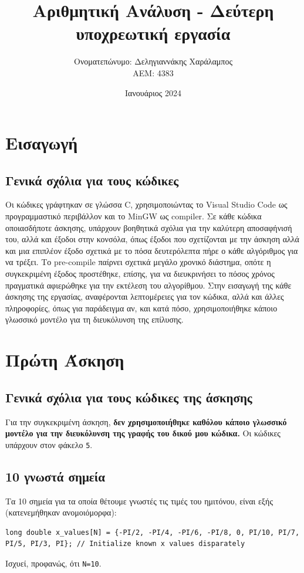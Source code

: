 \documentclass[a4paper, 14pt]{article}   %
\title{Αριθμητική Ανάλυση - Δεύτερη υποχρεωτική εργασία}   %
\author{Ονοματεπώνυμο: Δεληγιαννάκης Χαράλαμπος \\ ΑΕΜ: 4383}   %
\date{Ιανουάριος 2024}   %
\begin{document}

\maketitle   %

\section*{Εισαγωγή}   %


\subsection*{Γενικά σχόλια για τους κώδικες}   %
	Οι κώδικες γράφτηκαν σε γλώσσα C, χρησιμοποιώντας το Visual Studio Code ως προγραμμαστικό περιβάλλον και το MinGW ως compiler. Σε κάθε κώδικα οποιασδήποτε άσκησης, υπάρχουν βοηθητικά σχόλια για την καλύτερη αποσαφήνισή του, αλλά και έξοδοι στην κονσόλα, όπως έξοδοι που σχετίζονται με την άσκηση αλλά και μια επιπλέον έξοδο σχετικά με το πόσα δευτερόλεπτα πήρε ο κάθε αλγόριθμος για να τρέξει. Το pre-compile παίρνει σχετικά μεγάλο χρονικό διάστημα, οπότε η συγκεκριμένη έξοδος προστέθηκε, επίσης, για να διευκρινήσει το πόσος χρόνος πραγματικά αφιερώθηκε για την εκτέλεση του αλγορίθμου. Στην εισαγωγή της κάθε άσκησης της εργασίας, αναφέρονται λεπτομέρειες για τον κώδικα, αλλά και άλλες πληροφορίες, όπως για παράδειγμα αν, και κατά πόσο, χρησιμοποιήθηκε κάποιο γλωσσικό μοντέλο για τη διευκόλυνση της επίλυσης.


\section*{Πρώτη Άσκηση}   %

\subsection*{Γενικά σχόλια για τους κώδικες της άσκησης}   %
	Για την συγκεκριμένη άσκηση, \textbf{δεν χρησιμοποιήθηκε καθόλου κάποιο γλωσσικό μοντέλο για την διευκόλυνση της γραφής του δικού μου κώδικα.} Οι κώδικες υπάρχουν στον φάκελο \texttt{5}.

\subsection*{10 γνωστά σημεία} %
	Τα 10 σημεία για τα οποία θέτουμε γνωστές τις τιμές του ημιτόνου, είναι εξής (κατενεμήθηκαν ανομοιόμορφα):
\begin{lstlisting}
long double x_values[N] = {-PI/2, -PI/4, -PI/6, -PI/8, 0, PI/10, PI/7, PI/5, PI/3, PI}; // Initialize known x values disparately
\end{lstlisting}
Ισχυεί, προφανώς, ότι \texttt{N=10}.
\end{document}

